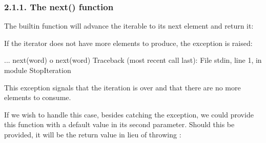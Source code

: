 \documentclass[a4paper,10pt,english]{sphinxmanual}
\begin{document}
\subsubsection{2.1.1. The next() function}
\label{\detokenize{chapters/7_generators/index:the-next-function}}
The  built\sphinxhyphen{}in function will advance the iterable to its next element and return it:

\begin{sphinxVerbatim}[commandchars=\\\{\}]
  
\end{sphinxVerbatim}

If the iterator does not have more elements to produce, the  exception is
raised:

\begin{sphinxVerbatim}[commandchars=\\\{\}]
\PYGZgt{}\PYGZgt{}\PYGZgt{} ...
\PYGZgt{}\PYGZgt{}\PYGZgt{} next(word)
\PYGZsq{}o\PYGZsq{}
\PYGZgt{}\PYGZgt{}\PYGZgt{} next(word)
Traceback (most recent call last):
File \PYGZdq{}\PYGZlt{}stdin\PYGZgt{}\PYGZdq{}, line 1, in \PYGZlt{}module\PYGZgt{}
StopIteration
\end{sphinxVerbatim}

This exception signals that the iteration is over and that there are no more elements to
consume.

If we wish to handle this case, besides catching the  exception, we could
provide this function with a default value in its second parameter. Should this be provided,
it will be the return value in lieu of throwing :

\begin{sphinxVerbatim}[commandchars=\\\{\}]
 
\end{sphinxVerbatim}
\end{document}
